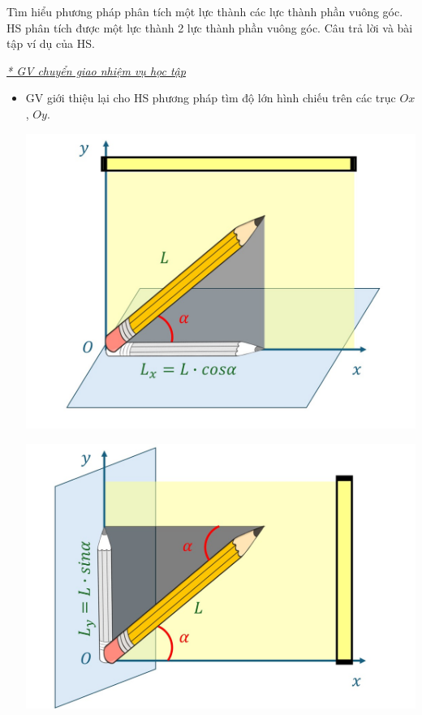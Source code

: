 \hoatdong
{Tìm hiểu phương pháp phân tích một lực thành các lực thành phần vuông góc.
}
{HS phân tích được một lực thành 2 lực thành phần vuông góc.
}
{Câu trả lời và bài tập ví dụ của HS.
}
{\textit{\underline{* GV chuyển giao nhiệm vụ học tập}}
	\begin{itemize}[label=-]
		\item GV giới thiệu lại cho HS phương pháp tìm độ lớn hình chiếu trên các trục $Ox$, $Oy$.
		\begin{center}
			\includegraphics[scale=0.5]{figs/G10-BAI9-7}
		\end{center}
		\begin{center}
			\includegraphics[scale=0.5]{figs/G10-BAI9-8}
		\end{center}

\end{itemize}}
